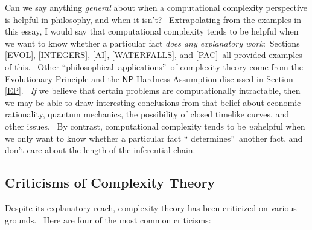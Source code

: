 \documentclass[12pt,onecolumn]{article}%
\begin{document}
Can we say anything \textit{general} about when a computational complexity
perspective is helpful in philosophy, and when it isn't? \ Extrapolating from
the examples in this essay, I would say that computational complexity tends to
be helpful when we want to know whether a particular fact \textit{does any
explanatory work}:\ Sections \ref{EVOL}, \ref{INTEGERS}, \ref{AI},
\ref{WATERFALLS}, and \ref{PAC}\ all provided examples of this. \ Other
\textquotedblleft philosophical\ applications\textquotedblright\ of complexity
theory come from the Evolutionary Principle and the $\mathsf{NP}$ Hardness
Assumption discussed in Section \ref{EP}. \ \textit{If} we believe that
certain problems are computationally intractable, then we may be able to draw
interesting conclusions from that belief about economic rationality, quantum
mechanics, the possibility of closed timelike curves, and other issues. \ By
contrast, computational complexity tends to be \textit{un}helpful when we only
want to know whether a particular fact \textquotedblleft
determines\textquotedblright\ another fact, and don't care about the length of
the inferential chain.

\subsection{Criticisms of Complexity Theory\label{CRITICISMS}}

Despite its explanatory reach, complexity theory has been criticized on
various grounds. \ Here are four of the most common criticisms:
\end{document}
